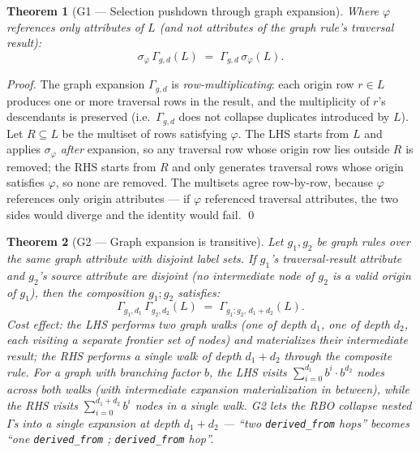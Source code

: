 \documentclass[sigconf,nonacm,review]{acmart}
\theoremstyle{plain}
\newtheorem{theorem}{Theorem}
\theoremstyle{definition}
\theoremstyle{remark}
\begin{document}
\begin{theorem}[G1 --- Selection pushdown through graph expansion]\label{thm:g1}
Where $\varphi$ references only attributes of $L$ (and not
attributes of the graph rule's traversal result):
\[
\sigma_\varphi\, \Gamma_{g, d}(L) \;=\; \Gamma_{g, d}\, \sigma_\varphi(L).
\]
\end{theorem}

\begin{proof}
The graph expansion $\Gamma_{g,d}$ is \emph{row-multiplicating}: each
origin row $r \in L$ produces one or more traversal rows in the
result, and the multiplicity of $r$'s descendants is preserved
(i.e.\ $\Gamma_{g,d}$ does not collapse duplicates introduced by
$L$). Let $R \subseteq L$ be the multiset of rows satisfying
$\varphi$. The LHS starts from $L$ and applies $\sigma_\varphi$
\emph{after} expansion, so any traversal row whose origin row lies
outside $R$ is removed; the RHS starts from $R$ and only
generates traversal rows whose origin satisfies $\varphi$, so
none are removed. The multisets agree row-by-row, because
$\varphi$ references only origin attributes --- if $\varphi$
referenced traversal attributes, the two sides would diverge and
the identity would fail. \qed
\end{proof}

\begin{theorem}[G2 --- Graph expansion is transitive]\label{thm:g2}
Let $g_1, g_2$ be graph rules over the same graph attribute
with disjoint label sets. If $g_1$'s traversal-result
attribute and $g_2$'s source attribute are disjoint (no
intermediate node of $g_2$ is a valid origin of $g_1$),
then the composition $g_1 ; g_2$ satisfies:
\[
\Gamma_{g_1, d_1}\, \Gamma_{g_2, d_2}(L) \;=\;
\Gamma_{g_1;g_2,\, d_1+d_2}(L).
\]
\emph{Cost effect:} the LHS performs two graph walks (one of
depth $d_1$, one of depth $d_2$, each visiting a separate
frontier set of nodes) and materializes their intermediate
result; the RHS performs a single walk of depth $d_1 + d_2$
through the composite rule. For a graph with branching factor
$b$, the LHS visits $\sum_{i=0}^{d_1} b^i \cdot b^{d_2}$ nodes
across both walks (with intermediate expansion materialization
in between), while the RHS visits $\sum_{i=0}^{d_1+d_2} b^i$ nodes
in a single walk. G2 lets the RBO collapse nested
$\Gamma$s into a single expansion at depth $d_1 + d_2$
--- ``two \texttt{derived\_from} hops'' becomes ``one
\texttt{derived\_from} ; \texttt{derived\_from} hop''.
\end{theorem}
\end{document}
